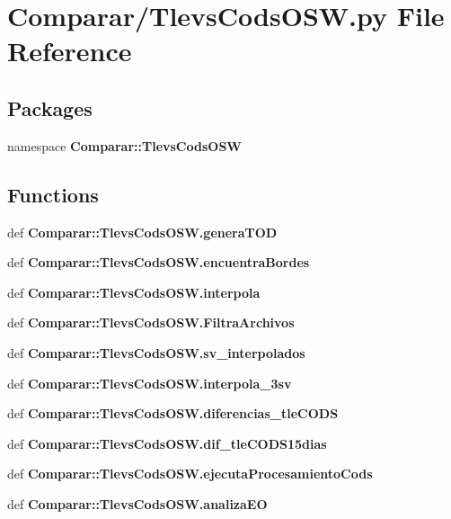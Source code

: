 \section{\-Comparar/\-Tlevs\-Cods\-O\-S\-W.py \-File \-Reference}
\label{_tlevs_cods_o_s_w_8py}
\subsection*{\-Packages}
\begin{DoxyCompactItemize}
\item 
namespace {\bf \-Comparar\-::\-Tlevs\-Cods\-O\-S\-W}
\end{DoxyCompactItemize}
\subsection*{\-Functions}
\begin{DoxyCompactItemize}
\item 
def {\bf \-Comparar\-::\-Tlevs\-Cods\-O\-S\-W.\-genera\-T\-O\-D}
\item 
def {\bf \-Comparar\-::\-Tlevs\-Cods\-O\-S\-W.\-encuentra\-Bordes}
\item 
def {\bf \-Comparar\-::\-Tlevs\-Cods\-O\-S\-W.\-interpola}
\item 
def {\bf \-Comparar\-::\-Tlevs\-Cods\-O\-S\-W.\-Filtra\-Archivos}
\item 
def {\bf \-Comparar\-::\-Tlevs\-Cods\-O\-S\-W.\-sv\-\_\-interpolados}
\item 
def {\bf \-Comparar\-::\-Tlevs\-Cods\-O\-S\-W.\-interpola\-\_\-3sv}
\item 
def {\bf \-Comparar\-::\-Tlevs\-Cods\-O\-S\-W.\-diferencias\-\_\-tle\-C\-O\-D\-S}
\item 
def {\bf \-Comparar\-::\-Tlevs\-Cods\-O\-S\-W.\-dif\-\_\-tle\-C\-O\-D\-S15dias}
\item 
def {\bf \-Comparar\-::\-Tlevs\-Cods\-O\-S\-W.\-ejecuta\-Procesamiento\-Cods}
\item 
def {\bf \-Comparar\-::\-Tlevs\-Cods\-O\-S\-W.\-analiza\-E\-O}
\end{DoxyCompactItemize}
